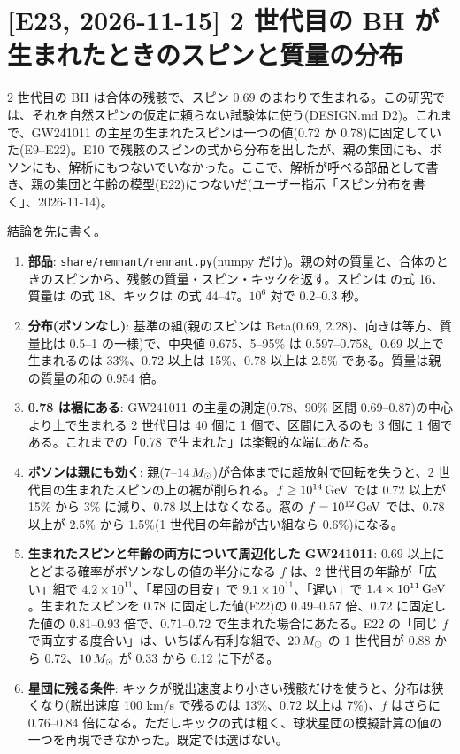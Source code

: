 \section{[E23, 2026-11-15] 2 世代目の BH が生まれたときのスピンと質量の分布}\label{sec:e23}

2 世代目の BH は合体の残骸で、スピン 0.69 のまわりで生まれる。この研究では、それを自然スピンの仮定に頼らない試験体に使う(DESIGN.md D2)。これまで、GW241011 の主星の生まれたスピンは一つの値(0.72 か 0.78)に固定していた(E9--E22)。E10 で残骸のスピンの式から分布を出したが、親の集団にも、ボソンにも、解析にもつないでいなかった。ここで、解析が呼べる部品として書き、親の集団と年齢の模型(E22)につないだ(ユーザー指示「スピン分布を書く」、2026-11-14)。

結論を先に書く。
\begin{enumerate}
\item \textbf{部品}: \texttt{share/remnant/remnant.py}(numpy だけ)。親の対の質量と、合体のときのスピンから、残骸の質量・スピン・キックを返す。スピンは  の式 16、質量は  の式 18、キックは  の式 44--47。$10^6$ 対で 0.2--0.3 秒。
\item \textbf{分布(ボソンなし)}: 基準の組(親のスピンは Beta(0.69, 2.28)、向きは等方、質量比は 0.5--1 の一様)で、中央値 0.675、5--95\% は 0.597--0.758。0.69 以上で生まれるのは 33\%、0.72 以上は 15\%、0.78 以上は 2.5\% である。質量は親の質量の和の 0.954 倍。
\item \textbf{0.78 は裾にある}: GW241011 の主星の測定(0.78、90\% 区間 0.69--0.87)の中心より上で生まれる 2 世代目は 40 個に 1 個で、区間に入るのも 3 個に 1 個である。これまでの「0.78 で生まれた」は楽観的な端にあたる。
\item \textbf{ボソンは親にも効く}: 親($7$--$14\,M_\odot$)が合体までに超放射で回転を失うと、2 世代目の生まれたスピンの上の裾が削られる。$f\ge10^{14}\,\mathrm{GeV}$ では 0.72 以上が 15\% から 3\% に減り、0.78 以上はなくなる。窓の $f=10^{12}\,\mathrm{GeV}$ では、0.78 以上が 2.5\% から 1.5\%(1 世代目の年齢が古い組なら 0.6\%)になる。
\item \textbf{生まれたスピンと年齢の両方について周辺化した GW241011}: 0.69 以上にとどまる確率がボソンなしの値の半分になる $f$ は、2 世代目の年齢が「広い」組で $4.2\times10^{11}$、「星団の目安」で $9.1\times10^{11}$、「遅い」で $1.4\times10^{11}\,\mathrm{GeV}$。生まれたスピンを 0.78 に固定した値(E22)の 0.49--0.57 倍、0.72 に固定した値の 0.81--0.93 倍で、0.71--0.72 で生まれた場合にあたる。E22 の「同じ $f$ で両立する度合い」は、いちばん有利な組で、$20\,M_\odot$ の 1 世代目が 0.88 から 0.72、$10\,M_\odot$ が 0.33 から 0.12 に下がる。
\item \textbf{星団に残る条件}: キックが脱出速度より小さい残骸だけを使うと、分布は狭くなり(脱出速度 100 km/s で残るのは 13\%、0.72 以上は 7\%)、$f$ はさらに 0.76--0.84 倍になる。ただしキックの式は粗く、球状星団の模擬計算の値の一つを再現できなかった。既定では選ばない。
\end{enumerate}

